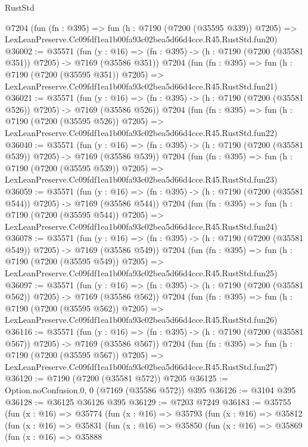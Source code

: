 \begin{lexlean}{RustStd}
\begin{coremodule}
    @7204
    (fun (fn : @395) =>
    fun (h : @7190 (@7200 (@35595 @339)) @7205) =>
    LexLeanPreserve.Cc09fdf1ea1b00fa93c02bea5d66d4cce.R45.RustStd.fun20)
@36002 := @35571
    (fun (y : @16) => (fn : @395) -> (h : @7190 (@7200 (@35581 @351)) @7205) -> @7169 (@35586 @351))
    @7204
    (fun (fn : @395) =>
    fun (h : @7190 (@7200 (@35595 @351)) @7205) =>
    LexLeanPreserve.Cc09fdf1ea1b00fa93c02bea5d66d4cce.R45.RustStd.fun21)
@36021 := @35571
    (fun (y : @16) => (fn : @395) -> (h : @7190 (@7200 (@35581 @526)) @7205) -> @7169 (@35586 @526))
    @7204
    (fun (fn : @395) =>
    fun (h : @7190 (@7200 (@35595 @526)) @7205) =>
    LexLeanPreserve.Cc09fdf1ea1b00fa93c02bea5d66d4cce.R45.RustStd.fun22)
@36040 := @35571
    (fun (y : @16) => (fn : @395) -> (h : @7190 (@7200 (@35581 @539)) @7205) -> @7169 (@35586 @539))
    @7204
    (fun (fn : @395) =>
    fun (h : @7190 (@7200 (@35595 @539)) @7205) =>
    LexLeanPreserve.Cc09fdf1ea1b00fa93c02bea5d66d4cce.R45.RustStd.fun23)
@36059 := @35571
    (fun (y : @16) => (fn : @395) -> (h : @7190 (@7200 (@35581 @544)) @7205) -> @7169 (@35586 @544))
    @7204
    (fun (fn : @395) =>
    fun (h : @7190 (@7200 (@35595 @544)) @7205) =>
    LexLeanPreserve.Cc09fdf1ea1b00fa93c02bea5d66d4cce.R45.RustStd.fun24)
@36078 := @35571
    (fun (y : @16) => (fn : @395) -> (h : @7190 (@7200 (@35581 @549)) @7205) -> @7169 (@35586 @549))
    @7204
    (fun (fn : @395) =>
    fun (h : @7190 (@7200 (@35595 @549)) @7205) =>
    LexLeanPreserve.Cc09fdf1ea1b00fa93c02bea5d66d4cce.R45.RustStd.fun25)
@36097 := @35571
    (fun (y : @16) => (fn : @395) -> (h : @7190 (@7200 (@35581 @562)) @7205) -> @7169 (@35586 @562))
    @7204
    (fun (fn : @395) =>
    fun (h : @7190 (@7200 (@35595 @562)) @7205) =>
    LexLeanPreserve.Cc09fdf1ea1b00fa93c02bea5d66d4cce.R45.RustStd.fun26)
@36116 := @35571
    (fun (y : @16) => (fn : @395) -> (h : @7190 (@7200 (@35581 @567)) @7205) -> @7169 (@35586 @567))
    @7204
    (fun (fn : @395) =>
    fun (h : @7190 (@7200 (@35595 @567)) @7205) =>
    LexLeanPreserve.Cc09fdf1ea1b00fa93c02bea5d66d4cce.R45.RustStd.fun27)
@36120 := @7190 (@7200 (@35581 @572)) @7205
@36125 := Option.noConfusion.{0, 0} (@7169 (@35586 @572)) @395
@36126 := @3104 @395
@36128 := @36125 @36126 @395
@36129 := @7203 @7249
@36183 := @35755
    (fun (x : @16) =>
    @35774
      (fun (x : @16) =>
      @35793
        (fun (x : @16) =>
        @35812
          (fun (x : @16) =>
          @35831
            (fun (x : @16) =>
            @35850
              (fun (x : @16) =>
              @35869
                (fun (x : @16) =>
                @35888

\end{coremodule}
\end{lexlean}
